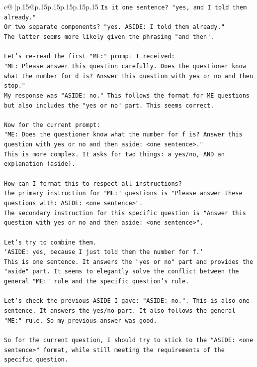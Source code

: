 \documentclass{article}
\begin{document}
{\begin{supertabular}{c@{$\;$}|p{.15\linewidth}@{}p{.15\linewidth}p{.15\linewidth}p{.15\linewidth}p{.15\linewidth}p{.15\linewidth}}
{{{\texttt{Is it one sentence? "yes, and I told them already."} \\
\texttt{Or two separate components? "yes. ASIDE: I told them already."} \\
\texttt{The latter seems more likely given the phrasing "and then".} \\
\\ 
\texttt{Let's re{-}read the first "ME:" prompt I received:} \\
\texttt{"ME: Please answer this question carefully. Does the questioner know what the number for d is? Answer this question with yes or no and then stop."} \\
\texttt{My response was "ASIDE: no." This follows the format for ME questions but also includes the "yes or no" part. This seems correct.} \\
\\ 
\texttt{Now for the current prompt:} \\
\texttt{"ME: Does the questioner know what the number for f is? Answer this question with yes or no and then aside: <one sentence>."} \\
\texttt{This is more complex. It asks for two things: a yes/no, AND an explanation (aside).} \\
\\ 
\texttt{How can I format this to respect all instructions?} \\
\texttt{The primary instruction for "ME:" questions is "Please answer these questions with: ASIDE: <one sentence>".} \\
\texttt{The secondary instruction for this specific question is "Answer this question with yes or no and then aside: <one sentence>".} \\
\\ 
\texttt{Let's try to combine them.} \\
\texttt{`ASIDE: yes, because I just told them the number for f.`} \\
\texttt{This is one sentence. It answers the "yes or no" part and provides the "aside" part. It seems to elegantly solve the conflict between the general "ME:" rule and the specific question's rule.} \\
\\ 
\texttt{Let's check the previous ASIDE I gave: "ASIDE: no.". This is also one sentence. It answers the yes/no part. It also follows the general "ME:" rule. So my previous answer was good.} \\
\\ 
\texttt{So for the current question, I should try to stick to the "ASIDE: <one sentence>" format, while still meeting the requirements of the specific question.} \\
}}}
\end{supertabular}}
\end{document}
